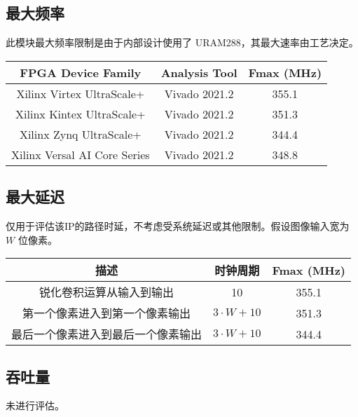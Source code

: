 \documentclass[12pt, a4paper, oneside]{ctexbook}
\begin{document}
		\subsection{最大频率}
		此模块最大频率限制是由于内部设计使用了 URAM288，其最大速率由工艺决定。
		\begin{table}[h]
			\centering
			\begin{tabular}{|c|c|c|}
				\hline
				\textbf{FPGA Device Family}  & \textbf{Analysis Tool} & \textbf{Fmax (MHz)} \\ \hline
				Xilinx Virtex UltraScale+    & Vivado 2021.2          & 355.1               \\ \hline
				Xilinx Kintex UltraScale+    & Vivado 2021.2          & 351.3               \\ \hline
				Xilinx Zynq UltraScale+      & Vivado 2021.2          & 344.4               \\ \hline
				Xilinx Versal AI Core Series & Vivado 2021.2          & 348.8               \\ \hline
			\end{tabular}
		\end{table}	
		\subsection{最大延迟}
		仅用于评估该IP的路径时延，不考虑受系统延迟或其他限制。假设图像输入宽为 $W$ 位像素。
		\begin{table}[h]
			\centering
			\begin{tabular}{|c|c|c|}
				\hline
				\textbf{描述}       & \textbf{时钟周期}   & \textbf{Fmax (MHz)} \\ \hline
				锐化卷积运算从输入到输出      & 10              & 355.1               \\ \hline
				第一个像素进入到第一个像素输出   & $3\cdot W+10$   & 351.3               \\ \hline
				最后一个像素进入到最后一个像素输出 & $3\cdot W + 10$ & 344.4               \\ \hline
			\end{tabular}
		\end{table}
		\subsection{吞吐量}
		未进行评估。
\end{document}
